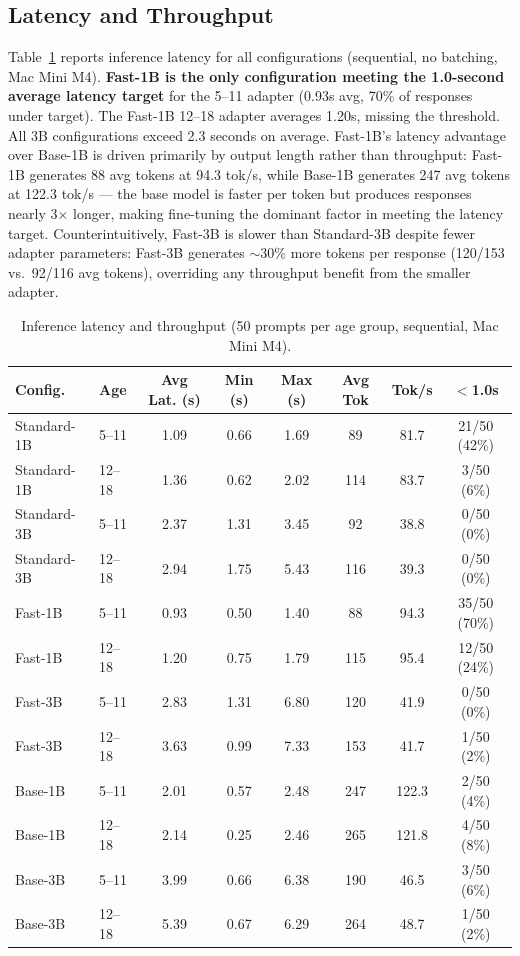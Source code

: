\documentclass[AMA,Times1COL]{WileyNJDv5} %
\begin{document}
\subsection{Latency and Throughput}

Table~\ref{tab:res3} reports inference latency for all configurations (sequential, no batching, Mac Mini M4). \textbf{Fast-1B is the only configuration meeting the 1.0-second average latency target} for the 5--11 adapter (0.93s avg, 70\% of responses under target). The Fast-1B 12--18 adapter averages 1.20s, missing the threshold. All 3B configurations exceed 2.3 seconds on average. Fast-1B's latency advantage over Base-1B is driven primarily by output length rather than throughput: Fast-1B generates 88 avg tokens at 94.3 tok/s, while Base-1B generates 247 avg tokens at 122.3 tok/s --- the base model is faster per token but produces responses nearly 3$\times$ longer, making fine-tuning the dominant factor in meeting the latency target. Counterintuitively, Fast-3B is slower than Standard-3B despite fewer adapter parameters: Fast-3B generates $\sim$30\% more tokens per response (120/153 vs.\ 92/116 avg tokens), overriding any throughput benefit from the smaller adapter.

\begin{table}[!t]
  \caption{Inference latency and throughput (50 prompts per age group, sequential, Mac Mini M4).}
  \label{tab:res3}
  \footnotesize
  \begin{tabular}{llcccccc}
    \hline
    Config. & Age & Avg Lat. (s) & Min (s) & Max (s) & Avg Tok & Tok/s & $<$1.0s \\
    \hline
    Standard-1B & 5--11  & 1.09 & 0.66 & 1.69 & 89  & 81.7  & 21/50 (42\%) \\
    Standard-1B & 12--18 & 1.36 & 0.62 & 2.02 & 114 & 83.7  & 3/50 (6\%)   \\
    Standard-3B & 5--11  & 2.37 & 1.31 & 3.45 & 92  & 38.8  & 0/50 (0\%)   \\
    Standard-3B & 12--18 & 2.94 & 1.75 & 5.43 & 116 & 39.3  & 0/50 (0\%)   \\
    Fast-1B     & 5--11  & 0.93 & 0.50 & 1.40 & 88  & 94.3  & 35/50 (70\%) \\
    Fast-1B     & 12--18 & 1.20 & 0.75 & 1.79 & 115 & 95.4  & 12/50 (24\%) \\
    Fast-3B     & 5--11  & 2.83 & 1.31 & 6.80 & 120 & 41.9  & 0/50 (0\%)   \\
    Fast-3B     & 12--18 & 3.63 & 0.99 & 7.33 & 153 & 41.7  & 1/50 (2\%)   \\
    Base-1B     & 5--11  & 2.01 & 0.57 & 2.48 & 247 & 122.3 & 2/50 (4\%)   \\
    Base-1B     & 12--18 & 2.14 & 0.25 & 2.46 & 265 & 121.8 & 4/50 (8\%)   \\
    Base-3B     & 5--11  & 3.99 & 0.66 & 6.38 & 190 & 46.5  & 3/50 (6\%)   \\
    Base-3B     & 12--18 & 5.39 & 0.67 & 6.29 & 264 & 48.7  & 1/50 (2\%)   \\
    \hline
  \end{tabular}
\end{table}
\end{document}
